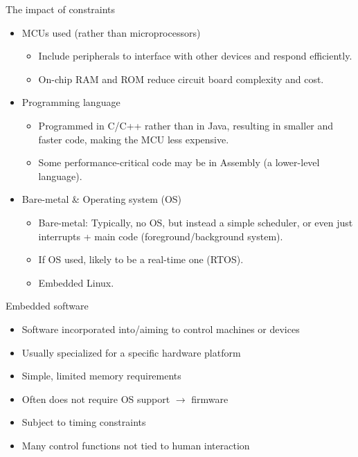 \begin{frame}{The impact of constraints}
\begin{itemize}
    \item MCUs used (rather than microprocessors)
    \begin{itemize}
        \item Include peripherals to interface with other devices and respond efficiently.
        \item On-chip RAM and ROM reduce circuit board complexity and cost.
    \end{itemize}
    \item Programming language
    \begin{itemize}
        \item Programmed in C/C++ rather than in Java, resulting in smaller and faster code, making the MCU less expensive.
        \item Some performance-critical code may be in Assembly (a lower-level language).
    \end{itemize}
    \item Bare-metal \& Operating system (OS)
    \begin{itemize}
        \item Bare-metal: Typically, no OS, but instead a simple scheduler, or even just interrupts + main code (foreground/background system).
        \item If OS used, likely to be a real-time one (RTOS).
        \item Embedded Linux.
    \end{itemize}
\end{itemize}
\end{frame}


\begin{frame}{Embedded software}
\begin{itemize}
    \item Software incorporated into/aiming to control machines or devices
    \item Usually specialized for a specific hardware platform
    \item Simple, limited memory requirements
    \item Often does not require OS support $\rightarrow$ firmware
    \item Subject to timing constraints
    \item Many control functions not tied to human interaction
\end{itemize}
\end{frame}

